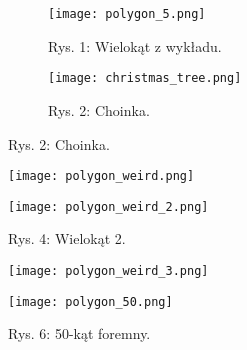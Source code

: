 \begin{figure}[!h]
    \centering
    \begin{subfigure}{.5\textwidth}
      \centering
      \texttt{[image: polygon\_5.png]}
      \caption*{Rys. 1: Wielokąt z wykładu.}
      \label{fig:sub1}
    \end{subfigure}%
    \begin{subfigure}{.5\textwidth}
      \centering
      \texttt{[image: christmas\_tree.png]}
      \caption*{Rys. 2: Choinka.}
      \label{fig:sub2}
    \end{subfigure}
    \label{fig:test}
    \end{figure}

\newpage

    \begin{figure}[!h]
    \centering
    \begin{minipage}{.5\textwidth}
      \centering
      \texttt{[image: polygon\_weird.png]}
      \caption*{Rys. 3: Wielokąt 1.}
      \label{fig:test1}
    \end{minipage}%
    \begin{minipage}{.5\textwidth}
      \centering
      \texttt{[image: polygon\_weird\_2.png]}
      \caption*{Rys. 4: Wielokąt 2.}
      \label{fig:test2}
    \end{minipage}
    \end{figure}
    \begin{figure}[!h]
        \centering
        \begin{minipage}{.5\textwidth}
          \centering
          \texttt{[image: polygon\_weird\_3.png]}
          \caption*{Rys. 5: Wielokąt 3.}
          \label{fig:test1}
        \end{minipage}%
        \begin{minipage}{.5\textwidth}
          \centering
          \texttt{[image: polygon\_50.png]}
          \caption*{Rys. 6: 50-kąt foremny.}
          \label{fig:test2}
        \end{minipage}
        \end{figure}

